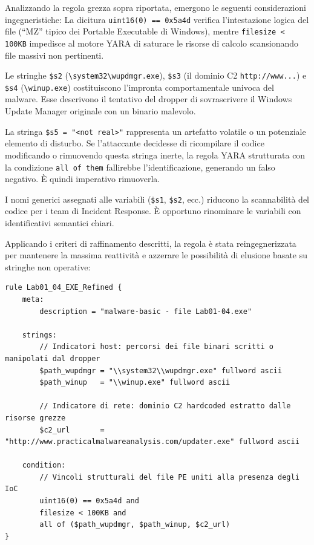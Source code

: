 Analizzando la regola grezza sopra riportata, emergono le seguenti considerazioni ingegneristiche:
La dicitura \texttt{uint16(0) == 0x5a4d} verifica l'intestazione logica del file (``MZ'' tipico dei Portable Executable di Windows), mentre \texttt{filesize < 100KB} impedisce al motore YARA di saturare le risorse di calcolo scansionando file massivi non pertinenti.

Le stringhe \texttt{\$s2} (\texttt{\textbackslash system32\textbackslash wupdmgr.exe}), \texttt{\$s3} (il dominio C2 \texttt{http://www...}) e \texttt{\$s4} (\texttt{\textbackslash winup.exe}) costituiscono l'impronta comportamentale univoca del malware. Esse descrivono il tentativo del dropper di sovrascrivere il Windows Update Manager originale con un binario malevolo.

La stringa \texttt{\$s5 = "<not real>"} rappresenta un artefatto volatile o un potenziale elemento di disturbo. Se l'attaccante decidesse di ricompilare il codice modificando o rimuovendo questa stringa inerte, la regola YARA strutturata con la condizione \texttt{all of them} fallirebbe l'identificazione, generando un falso negativo. È quindi imperativo rimuoverla.

I nomi generici assegnati alle variabili (\texttt{\$s1}, \texttt{\$s2}, ecc.) riducono la scannabilità del codice per i team di Incident Response. È opportuno rinominare le variabili con identificativi semantici chiari.

Applicando i criteri di raffinamento descritti, la regola è stata reingegnerizzata per mantenere la massima reattività e azzerare le possibilità di elusione basate su stringhe non operative:

\begin{lstlisting}
rule Lab01_04_EXE_Refined {
    meta:
        description = "malware-basic - file Lab01-04.exe"
    
    strings:
        // Indicatori host: percorsi dei file binari scritti o manipolati dal dropper
        $path_wupdmgr = "\\system32\\wupdmgr.exe" fullword ascii
        $path_winup   = "\\winup.exe" fullword ascii
        
        // Indicatore di rete: dominio C2 hardcoded estratto dalle risorse grezze
        $c2_url       = "http://www.practicalmalwareanalysis.com/updater.exe" fullword ascii

    condition:
        // Vincoli strutturali del file PE uniti alla presenza degli IoC
        uint16(0) == 0x5a4d and 
        filesize < 100KB and 
        all of ($path_wupdmgr, $path_winup, $c2_url)
}
\end{lstlisting}

